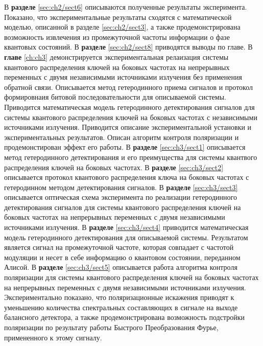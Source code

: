 \newline В \textbf{разделе} \ref{sec:ch2/sect6} описываются полученные результаты эксперимента. Показано, что экспериментальные результаты сходятся с математической моделью, описанной в разделе \ref{sec:ch2/sect3}, а также продемонстрирована возможность извлечения из промежуточной частоты информации о фазе квантовых состояний.
\newline В \textbf{разделе} \ref{sec:ch2/sect8} приводятся выводы по главе.
\newline В \textbf{главе} \ref{ch:ch3} демонстрируется экспериментальная релаизация системы квантового распределения ключей на боковых частотах на непрерывных переменных с двумя независимыми источниками излучения без применения обратной связи. Описывается метод гетеродинного приема сигналов и протокол формировнаия битовой последовательности для описываемой системы.  Приводится математическая модель гетеродинного детектирования сигналов для системы квантового распределения ключей на боковых частотах с независимыми источниками излучения. Приводится описание экспериментальной установки и экспериментальных результатов. Описан алгоритм контроля поляризации и продемонстирован эффект его работы.
\newline В \textbf{разделе} \ref{sec:ch3/sect1} описывается метод гетеродинного детектирования и его преимущества для системы квантвого распределения ключей на боковых частотах.
\newline В \textbf{разделе} \ref{sec:ch3/sect2} описывается протокол квантового распределения ключа на боковых частотах с гетеродинном методом детектирования сигналов.
\newline В \textbf{разделе} \ref{sec:ch3/sect3} описывается оптическая схема эксперимента по реализации гетеродинного детектирования сигналов для системы квантового распределения ключей на боковых частотах на непрерывных переменных с двумя независимыми источниками излучения.
\newline В \textbf{разделе} \ref{sec:ch3/sect4} приводится математическая модель гетеродинного детектирования для описываемой системы. Результатом является сигнал на промежуточной частоте, которая совпадает с частотой модуляции и несет в себе информацию о квантовом состоянии, переданном Алисой.
\newline В \textbf{разделе} \ref{sec:ch3/sect5} описывается работа алгоритма контроля поляризации для системы квантового распределения ключей на боковых частотах на непрерывных переменных с двумя независимыми источниками излучения. Экспериментально показано, что поляризационные искажения приводят к уменьшению количества спектральных составляющих в сигнале на выходе балансного детектора, а также продемонстрирована возможность подстройки поляризации по результату работы Быстрого Преобразования Фурье, примененного к этому сигналу.
